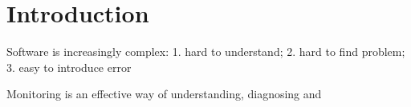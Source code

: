\chapter{Introduction}

Software is increasingly complex:
1. hard to understand;
2. hard to find problem;
3. easy to introduce error

Monitoring is an effective way of understanding, diagnosing and 
